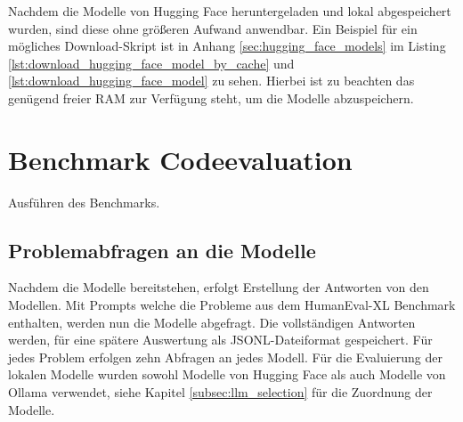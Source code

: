 Nachdem die Modelle von Hugging Face heruntergeladen und lokal abgespeichert wurden, sind diese ohne größeren Aufwand anwendbar. Ein Beispiel für ein mögliches Download-Skript ist in Anhang \ref{sec:hugging_face_models} im Listing \ref{lst:download_hugging_face_model_by_cache} und \ref{lst:download_hugging_face_model} zu sehen. Hierbei ist zu beachten das genügend freier RAM zur Verfügung steht, um die Modelle abzuspeichern.








\section{Benchmark Codeevaluation}\label{sec:benchmark_evaluation}
Ausführen des Benchmarks.


\subsection{Problemabfragen an die Modelle}
Nachdem die Modelle bereitstehen, erfolgt Erstellung der Antworten von den Modellen. Mit Prompts welche die Probleme aus dem HumanEval-XL Benchmark enthalten, werden nun die Modelle abgefragt. Die vollständigen Antworten werden, für eine spätere Auswertung als JSONL-Dateiformat gespeichert. Für jedes Problem erfolgen zehn Abfragen an jedes Modell. Für die Evaluierung der lokalen Modelle wurden sowohl Modelle von Hugging Face als auch Modelle von Ollama verwendet, siehe Kapitel \ref{subsec:llm_selection} für die Zuordnung der Modelle.

